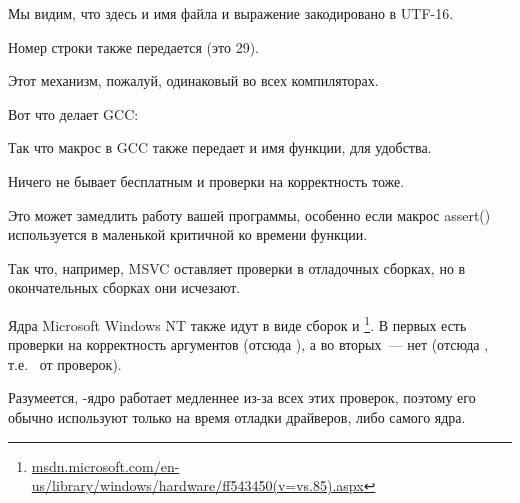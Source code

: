 Мы видим, что здесь и имя файла и выражение закодировано в UTF-16.

Номер строки также передается (это 29).

Этот механизм, пожалуй, одинаковый во всех компиляторах.

Вот что делает GCC:



Так что макрос в GCC также передает и имя функции, для удобства.

Ничего не бывает бесплатным и проверки на корректность тоже.

Это может замедлить работу вашей программы, особенно если макрос assert() используется в маленькой
критичной ко времени функции.

Так что, например, MSVC оставляет проверки в отладочных сборках, но в окончательных сборках они исчезают.
 
Ядра Microsoft \gls{Windows NT} также идут в виде сборок  и 
\footnote{\href{http://go.yurichev.com/17259}{msdn.microsoft.com/en-us/library/windows/hardware/ff543450(v=vs.85).aspx}}.
В первых есть проверки на корректность аргументов (отсюда ), а во вторых~--- нет (отсюда ,
т.е.~ от проверок).

Разумеется, -ядро работает медленнее из-за всех этих проверок, поэтому его обычно используют только на время отладки драйверов, либо самого ядра.

